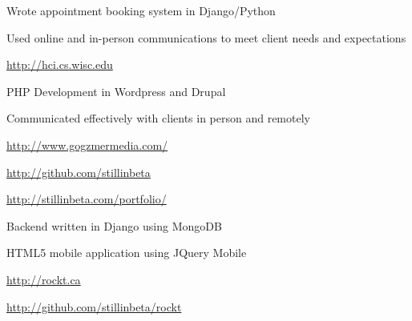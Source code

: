 \documentclass[letterpaper,11pt,notitlepage]{article}
\begin{document}
        \begin{employment}
            \item Wrote appointment booking system in Django/Python 
            \item Used online and in-person communications to meet client needs
            and expectations
            \item \url{http://hci.cs.wisc.edu}
        \end{employment}
        \begin{employment}
            \item PHP Development in Wordpress and Drupal
            \item Communicated effectively with clients in person and remotely
            \item \url{http://www.gogzmermedia.com/}
        \end{employment}
\vbar
{}
        \begin{employment}
           \item \url{http://github.com/stillinbeta}
        \end{employment}
        \begin{employment}
            \item \url{http://stillinbeta.com/portfolio/}
        \end{employment}
        \begin{employment}
            \item Backend written in Django using MongoDB
            \item HTML5 mobile application using JQuery Mobile
            \item \url{http://rockt.ca}
            \item \url{http://github.com/stillinbeta/rockt}
        \end{employment}
    
\end{document}
